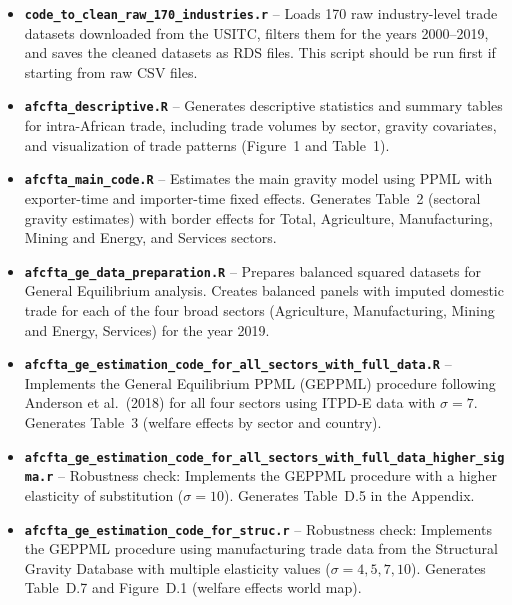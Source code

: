 \documentclass[12pt]{article}
\begin{document}
\begin{itemize}
	\item \textbf{\texttt{code\_to\_clean\_raw\_170\_industries.r}} -- Loads 170 raw industry-level trade datasets downloaded from the USITC, filters them for the years 2000--2019, and saves the cleaned datasets as RDS files. This script should be run first if starting from raw CSV files.
	
	\item \textbf{\texttt{afcfta\_descriptive.R}} -- Generates descriptive statistics and summary tables for intra-African trade, including trade volumes by sector, gravity covariates, and visualization of trade patterns (Figure~1 and Table~1).
	
	\item \textbf{\texttt{afcfta\_main\_code.R}} -- Estimates the main gravity model using PPML with exporter-time and importer-time fixed effects. Generates Table~2 (sectoral gravity estimates) with border effects for Total, Agriculture, Manufacturing, Mining and Energy, and Services sectors.
	
	\item \textbf{\texttt{afcfta\_ge\_data\_preparation.R}} -- Prepares balanced squared datasets for General Equilibrium analysis. Creates balanced panels with imputed domestic trade for each of the four broad sectors (Agriculture, Manufacturing, Mining and Energy, Services) for the year 2019.
	
	\item \textbf{\texttt{afcfta\_ge\_estimation\_code\_for\_all\_sectors\_with\_full\_data.R}} -- Implements the General Equilibrium PPML (GEPPML) procedure following Anderson et al.\ (2018) for all four sectors using ITPD-E data with $\sigma = 7$. Generates Table~3 (welfare effects by sector and country).
	
	\item \textbf{\texttt{afcfta\_ge\_estimation\_code\_for\_all\_sectors\_with\_full\_data\_higher\_sigma.r}} -- Robustness check: Implements the GEPPML procedure with a higher elasticity of substitution ($\sigma = 10$). Generates Table~D.5 in the Appendix.
	
	\item \textbf{\texttt{afcfta\_ge\_estimation\_code\_for\_struc.r}} -- Robustness check: Implements the GEPPML procedure using manufacturing trade data from the Structural Gravity Database with multiple elasticity values ($\sigma = 4, 5, 7, 10$). Generates Table~D.7 and Figure~D.1 (welfare effects world map).
	

\end{itemize}
\end{document}
